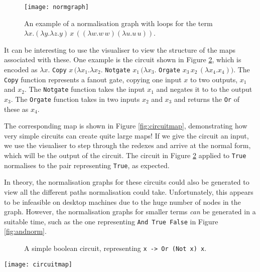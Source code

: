 \documentclass[11pt]{article}
\begin{document}
\begin{figure}
    \centering
    \texttt{[image: normgraph]}
    \caption{An example of a normalisation graph with loops for the term $\lambda x. (\lambda y. \lambda z. y) \, x \, ((\lambda w. w \, w)(\lambda u. u \, u))$.}
    \label{fig:omega}
\end{figure}

It can be interesting to use the visualiser to view the structure of the maps associated with these. One example is the circuit shown in Figure \ref{fig:circuit}, which is encoded as $\lambda x.$ \texttt{Copy} $x \, (\lambda x_1. \lambda x_2.$ \texttt{Notgate} $x_1 \, (\lambda x_3.$ \texttt{Orgate} $x_3 \, x_2 \, (\lambda x_4. x_4))$. The \texttt{Copy} function represents a fanout gate, copying one input $x$ to two outputs, $x_1$ and $x_2$. The \texttt{Notgate} function takes the input $x_1$ and negates it to to the output $x_3$. The \texttt{Orgate} function takes in two inputs $x_2$ and $x_3$ and returns the \texttt{Or} of these as $x_4$.

The corresponding map is shown in Figure \ref{fig:circuitmap}, demonstrating how very simple circuits can create quite large maps! If we give the circuit an input, we use the visualiser to step through the redexes and arrive at the normal form, which will be the output of the circuit. The circuit in Figure \ref{fig:circuit} applied to \texttt{True} normalises to the pair representing \texttt{True}, as expected.

In theory, the normalisation graphs for these circuits could also be generated to view all the different paths normalisation could take. Unfortunately, this appears to be infeasible on desktop machines due to the huge number of nodes in the graph. However, the normalisation graphs for smaller terms \textit{can} be generated in a suitable time, such as the one representing \texttt{And True False} in Figure \ref{fig:andnorm}.


\begin{figure}
    \centering
    
    \caption{A simple boolean circuit, representing \texttt{x -> Or (Not x) x}.}
    \label{fig:circuit}
\end{figure}

\begin{sidewaysfigure}
    \centering
    \texttt{[image: circuitmap]}
    \caption{The corresponding map for the circuit in Figure \ref{fig:circuit}}
    \label{fig:circuitmap}
\end{sidewaysfigure}
\end{document}
